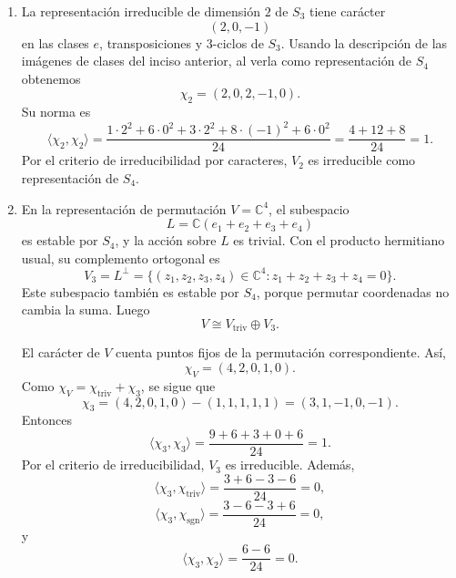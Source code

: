 \documentclass[10pt,a4paper]{article}
\newcommand{\CC}{\mathbb{C}}
\begin{document}
\begin{enumerate}[label=(\alph*),leftmargin=2.4em]
La imagen de las clases de $S_4$ bajo $\varphi$ tiene el siguiente tipo en $S_3$:
\[
  e\mapsto e,
  \qquad [(12)]\mapsto \text{transposiciones},
  \qquad [(12)(34)]\mapsto e,
\]
\[
  [(123)]\mapsto \text{$3$-ciclos},
  \qquad [(1234)]\mapsto \text{transposiciones}.
\]
Por tanto, al traer las representaciones trivial y signo de $S_3$ a $S_4$, obtenemos
\[
  \chi_{\mathrm{triv}}=(1,1,1,1,1),
  \qquad
  \chi_{\mathrm{sgn}}=(1,-1,1,1,-1).
\]
Sus normas son
\[
  \langle \chi_{\mathrm{triv}},\chi_{\mathrm{triv}}\rangle
  =\frac{1+6+3+8+6}{24}=1,
\]
\[
  \langle \chi_{\mathrm{sgn}},\chi_{\mathrm{sgn}}\rangle
  =\frac{1+6+3+8+6}{24}=1.
\]
Además,
\[
  \langle \chi_{\mathrm{triv}},\chi_{\mathrm{sgn}}\rangle
  =\frac{1-6+3+8-6}{24}=0.
\]

\item La representación irreducible de dimensión $2$ de $S_3$ tiene carácter
\[
  (2,0,-1)
\]
en las clases $e$, transposiciones y $3$-ciclos de $S_3$. Usando la descripción de las
imágenes de clases del inciso anterior, al verla como representación de $S_4$ obtenemos
\[
  \chi_2=(2,0,2,-1,0).
\]
Su norma es
\[
  \langle \chi_2,\chi_2\rangle
  =\frac{1\cdot 2^2+6\cdot 0^2+3\cdot 2^2+8\cdot (-1)^2+6\cdot 0^2}{24}
  =\frac{4+12+8}{24}=1.
\]
Por el criterio de irreducibilidad por caracteres, $V_2$ es irreducible como representación
de $S_4$.

\item En la representación de permutación $V=\CC^4$, el subespacio
\[
  L=\CC(e_1+e_2+e_3+e_4)
\]
es estable por $S_4$, y la acción sobre $L$ es trivial. Con el producto hermitiano usual,
su complemento ortogonal es
\[
  V_3=L^\perp
  =\{(z_1,z_2,z_3,z_4)\in\CC^4:z_1+z_2+z_3+z_4=0\}.
\]
Este subespacio también es estable por $S_4$, porque permutar coordenadas no cambia la suma.
Luego
\[
  V\cong V_{\mathrm{triv}}\oplus V_3.
\]

El carácter de $V$ cuenta puntos fijos de la permutación correspondiente. Así,
\[
  \chi_V=(4,2,0,1,0).
\]
Como $\chi_V=\chi_{\mathrm{triv}}+\chi_3$, se sigue que
\[
  \chi_3=(4,2,0,1,0)-(1,1,1,1,1)=(3,1,-1,0,-1).
\]
Entonces
\[
  \langle \chi_3,\chi_3\rangle
  =\frac{9+6+3+0+6}{24}=1.
\]
Por el criterio de irreducibilidad, $V_3$ es irreducible. Además,
\[
  \langle \chi_3,\chi_{\mathrm{triv}}\rangle
  =\frac{3+6-3-6}{24}=0,
\]
\[
  \langle \chi_3,\chi_{\mathrm{sgn}}\rangle
  =\frac{3-6-3+6}{24}=0,
\]
y
\[
  \langle \chi_3,\chi_2\rangle
  =\frac{6-6}{24}=0.
\]


\end{enumerate}
\end{document}
